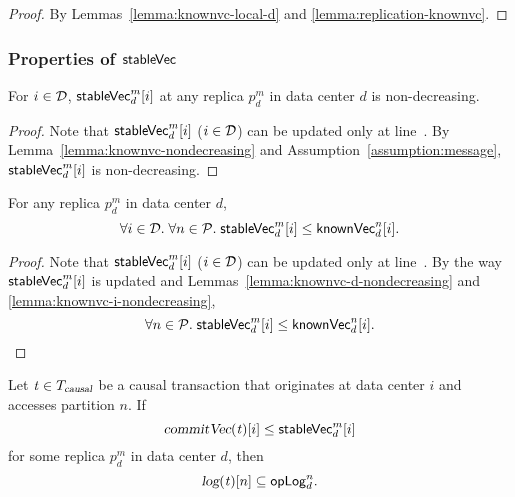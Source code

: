 \begin{proof} \label{proof:knownvc-causal}
  By Lemmas~\ref{lemma:knownvc-local-d} and \ref{lemma:replication-knownvc}.
\end{proof}
\subsubsection{Properties of ${\sf stableVec}$}
\label{sss:stablevc}

\begin{applemma} \label{lemma:stablevc-nondecreasing}
  For $i \in \mathcal{D}$, ${\sf stableVec}^{m}_{d}[i]$
  at any replica $p^{m}_{d}$ in data center $d$ is non-decreasing.
\end{applemma}

\begin{proof} \label{proof:stablevc-nondecreasing}
  Note that ${\sf stableVec}^{m}_{d}[i]$ ($i \in \mathcal{D}$) can be updated
  only at line~\code{\ref{alg:unistore-clock}}{\ref{line:knownvclocal-stablevc-causal}}.
  By Lemma~\ref{lemma:knownvc-nondecreasing}
  and Assumption~\ref{assumption:message},
  ${\sf stableVec}^{m}_{d}[i]$ is non-decreasing.
\end{proof}

\begin{applemma}[\prop{2}] \label{lemma:stablevc-knownvc}
  For any replica $p^{m}_{d}$ in data center $d$,
  \[
    \forall i \in \mathcal{D}.\; \forall n \in \mathcal{P}.\;
      {\sf stableVec}^{m}_{d}[i] \le {\sf knownVec}^{n}_{d}[i].
  \]
\end{applemma}

\begin{proof} \label{proof:stablevc-knownvc}
  Note that ${\sf stableVec}^{m}_{d}[i]$ ($i \in \mathcal{D}$)
  can be updated only
  at line~\code{\ref{alg:unistore-clock}}{\ref{line:knownvclocal-stablevc-causal}}.
  By the way ${\sf stableVec}^{m}_{d}[i]$ is updated
  and Lemmas~\ref{lemma:knownvc-d-nondecreasing}
  and \ref{lemma:knownvc-i-nondecreasing},
  \[
    \forall n \in \mathcal{P}.\; {\sf stableVec}^{m}_{d}[i] \le {\sf knownVec}^{n}_{d}[i].
  \]
\end{proof}

\begin{applemma} \label{lemma:replication-stablevc}
  Let $\mathit{t} \in T_{\textsl{causal}}$ be a causal transaction
  that originates at data center $i$
  and accesses partition $n$.
  If
  \[
    \textsl{commitVec}(\mathit{t})[i] \le {\sf stableVec}^{m}_{d}[i]
  \]
  for some replica $p^{m}_{d}$ in data center $d$,
  then
  \[
    \textsl{log}(\mathit{t})[n] \subseteq {\sf opLog}^{n}_{d}.
  \]
\end{applemma}

